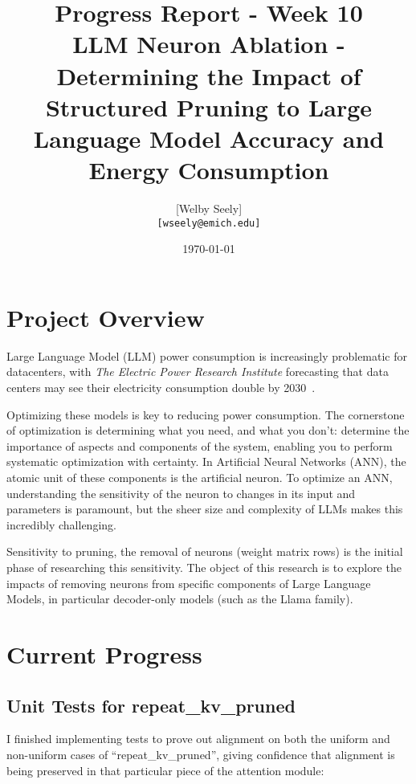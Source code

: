 \documentclass{article}
\title{Progress Report - Week 10 \\
\large LLM Neuron Ablation - Determining the Impact of Structured Pruning to Large Language Model Accuracy and Energy Consumption}
\author{
    [Welby Seely] \\
    \texttt{[wseely@emich.edu]}
}
\date{\today}
\begin{document}
    \maketitle


    \section{Project Overview}\label{sec:project-overview}
    Large Language Model (LLM) power consumption is increasingly problematic for datacenters, with \textit{The Electric Power
    Research Institute} forecasting that data centers may see their electricity consumption double by
    2030~\cite{kindig2024}.

    Optimizing these models is key to reducing power consumption.
    The cornerstone of optimization is determining what you need, and what you don't: determine the importance of
    aspects and components of the system, enabling you to perform systematic optimization with certainty.
    In Artificial Neural Networks (ANN), the atomic unit of these components is the artificial neuron.
    To optimize an ANN, understanding the sensitivity of the neuron to changes in its input and parameters is paramount,
    but the sheer size and complexity of LLMs makes this incredibly challenging.

    Sensitivity to pruning, the removal of neurons (weight matrix rows) is the initial phase of researching this sensitivity.
    The object of this research is to explore the impacts of removing neurons from specific components of Large Language Models, in particular decoder-only models (such as the Llama family).


    \section{Current Progress}\label{sec:current-progress}

    \subsection{Unit Tests for repeat\_kv\_pruned}\label{subsec:unit-tests-for-repeat_kv_pruned}

    I finished implementing tests to prove out alignment on both the uniform and non-uniform cases of ``repeat\_kv\_pruned'',
    giving confidence that alignment is being preserved in that particular piece of the attention module:
\end{document}
